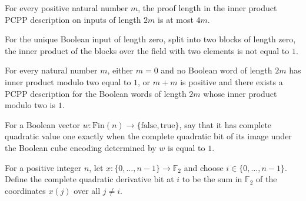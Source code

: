 \begin{theorem}
\label{FABL.innerProductLinearPCPPDescription_proofLength_le_twice_inputLength}
\leanok
{}
For every positive natural number $m$, the proof length in the inner product PCPP
description on inputs of length $2m$ is at most $4m$.
\end{theorem}

\begin{theorem}
\label{FABL.not_isInnerProductModTwoOne_zero}
\leanok
{}
For the unique Boolean input of length zero, split into two blocks of length zero, the
inner product of the blocks over the field with two elements is not equal to $1$.
\end{theorem}

\begin{theorem}
\label{FABL.innerProductLinearPCPPDescription_or_zero}
\leanok
{}
For every natural number $m$, either $m=0$ and no Boolean word of length $2m$ has inner
product modulo two equal to $1$, or $m+m$ is positive and there exists a PCPP
description for the Boolean words of length $2m$ whose inner product modulo two is $1$.
\end{theorem}

\begin{definition}
\label{FABL.IsCompleteQuadraticOne}
\leanok
{}
For a Boolean vector $w \colon \mathrm{Fin}(n) \to
\{\mathrm{false},\mathrm{true}\}$, say that it has complete quadratic value one
exactly when the complete quadratic bit of its image under the Boolean cube encoding
determined by $w$ is equal to $1$.
\end{definition}

\begin{definition}
\label{FABL.completeQuadraticDerivativeBit}
\leanok
{}
For a positive integer $n$, let $x\colon\{0,\ldots,n-1\}\to\mathbb{F}_2$ and choose
$i\in\{0,\ldots,n-1\}$. Define the complete quadratic derivative bit at $i$ to be the
sum in $\mathbb{F}_2$ of the coordinates $x(j)$ over all $j\ne i$.
\end{definition}

